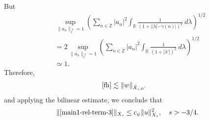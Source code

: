 \documentclass[12pt,reqno]{amsart}
\numberwithin{equation}{section}  %
\renewcommand{\cref}{\Cref}
\newcommand{\rr}{\mathbb{R}}
\newcommand{\zz}{\mathbb{Z}}
\newcommand{\zzdot}{\dot{\zz}}
\begin{document}
%
But
\begin{equation*}
	\begin{split}
	  &  \sup_{\|a_{n}\|_{\dot{\ell}^{2}}=1}\left( \sum_{n \in \zzdot} | a_{n} |^2\int_{\rr} \frac{1}{\left( 1 + | |\lambda| -
		\gamma(n) | \right)^{2 }} \ d \lambda  
		\right)^{1/2} 
		\\
		& = 2 \sup_{\|a_{n}\|_{\dot{\ell}^{2}}=1}\left ( \sum_{n \in \zzdot}
		| a_n |^2 
		\int_{\rr} \frac{1}{\left( 1 + | \lambda' | \right)^{2}} \ d 
		\lambda \right)^{1/2}
		\\
		& \simeq 1.
		\end{split}
\end{equation*}
%
Therefore,
%
%
\begin{equation*}
\begin{split}
  \cref{fh}
  & \lesssim \|  w \|_{\dot{X}_{s, 0}}.
\end{split}
\end{equation*}
%
%
and applying the bilinear estimate, we conclude that 
%
%
\begin{equation}
  \label{main-int3-est}
	\begin{split}
    \|\cref{main1-rel-term-3}\|_{X_{s}} \le c_{\psi} 
     \|u\|^{2}_{X_{s}}, \quad   s > -3/4.
	\end{split}
\end{equation}

%
%
%
\end{document}
